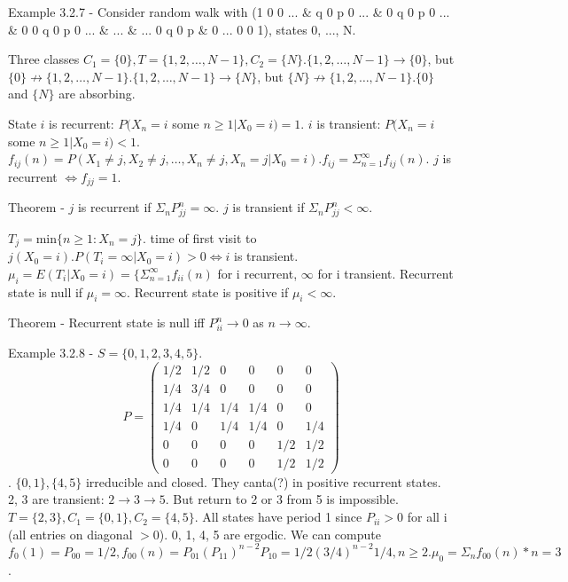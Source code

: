 \documentclass{article}
\begin{document}
Example 3.2.7 - Consider random walk with (1 0 0 ... \& q 0 p 0 ... \& 0 q 0 p 0 ... \& 0 0 q 0 p 0 ... \& ... \& ... 0 q 0 p \& 0 ... 0 0 1), states 0, ..., N.

Three classes $C_1 = \{0\}, T = \{1, 2, \dots, N-1\}, C_2 = \{N\}. \{1, 2, \dots, N-1\} \rightarrow \{0\}$, but $\{0\} \not \rightarrow \{1, 2, \dots, N-1\}. \{1, 2, \dots, N-1\} \rightarrow \{N\}$, but $\{N\} \not \rightarrow \{1, 2, \dots, N-1\}. \{0\}$ and $\{N\}$ are absorbing.

State $i$ is recurrent: $P(X_n=i$ some $n \ge 1|X_0=i)=1$. $i$ is transient: $P(X_n=i$ some $n \ge 1|X_0=i) < 1$. $f_{ij}(n) = P(X_1 \ne j, X_2 \ne j, \dots, X_n \ne j, X_n=j|X_0=i). f_{ij} = \Sigma_{n=1}^\infty f_{ij} (n)$. $j$ is recurrent $\iff f_{jj} = 1$.

Theorem - $j$ is recurrent if $\Sigma_n P_{jj}^n = \infty$. $j$ is transient if $\Sigma_n P_{jj}^n < \infty$.

$T_j = $min$\{n \ge 1: X_n=j\}$. time of first visit to $j (X_0=i). P(T_i = \infty | X_0=i) > 0 \iff i$ is transient. $\mu_i = E(T_i | X_0=i) = \{ \Sigma_{n=1}^\infty f_{ii}(n)$ for i recurrent, $\infty$ for i transient. Recurrent state is null if $\mu_i = \infty$. Recurrent state is positive if $\mu_i < \infty$.

Theorem - Recurrent state is null iff $P_{ii}^n \rightarrow 0$ as $n \rightarrow \infty$.

Example 3.2.8 - $S = \{0, 1, 2, 3, 4, 5\}$. \begin{displaymath} P = \left( \begin{array}{cccccc} 1/2 & 1/2 & 0 & 0 & 0 & 0 \\ 1/4 & 3/4 & 0 & 0 & 0 & 0 \\ 1/4 & 1/4 & 1/4 & 1/4 & 0 & 0 \\ 1/4 & 0 & 1/4 & 1/4 & 0 & 1/4 \\ 0 & 0 & 0 & 0 & 1/2 & 1/2 \\ 0 & 0 & 0 & 0 & 1/2 & 1/2 \end{array} \right) \end{displaymath}. $\{0, 1\}, \{4, 5\}$ irreducible and closed. They canta(?) in positive recurrent states. 2, 3 are transient: $2 \rightarrow 3 \rightarrow 5$. But return to 2 or 3 from 5 is impossible. $T = \{2, 3\}, C_1 = \{0, 1\}, C_2 = \{4, 5\}$. All states have period 1 since $P_{ii} > 0$ for all i (all entries on diagonal $> 0$). 0, 1, 4, 5 are ergodic. We can compute $f_0(1) = P_{00} = 1/2, f_{00}(n) = P_{01} (P_{11})^{n-2} P_{10} = 1/2 (3/4)^{n-2} 1/4, n \ge 2. \mu_0 = \Sigma_n f_{00}(n) * n = 3$.
\end{document}
